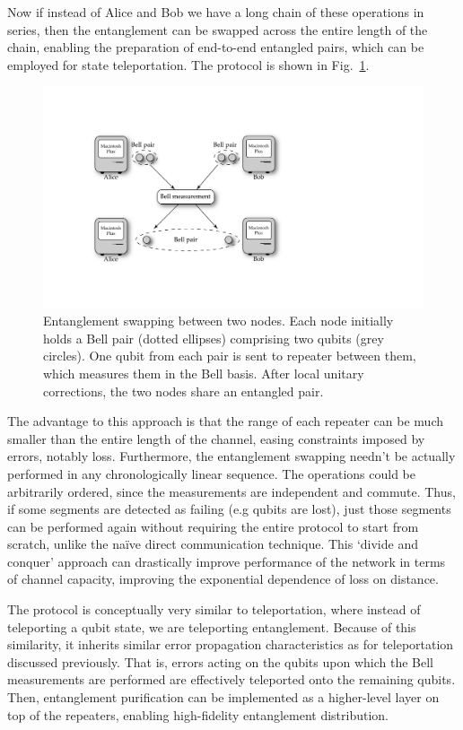 \documentclass[aps,rmp,twocolumn,amsmath,amssymb,nofootinbib,superscriptaddress]{revtex4}
\begin{document}
Now if instead of Alice and Bob we have a long chain of these operations in series, then the entanglement can be swapped across the entire length of the chain, enabling the preparation of end-to-end entangled pairs, which can be employed for state teleportation. The protocol is shown in Fig.~\ref{fig:ent_swap}.

\begin{figure}[!htb]
\includegraphics[width=\columnwidth]{ent_swap}
\caption{Entanglement swapping between two nodes. Each node initially holds a Bell pair (dotted ellipses) comprising two qubits (grey circles). One qubit from each pair is sent to repeater between them, which measures them in the Bell basis. After local unitary corrections, the two nodes share an entangled pair.} \label{fig:ent_swap}
\end{figure}

The advantage to this approach is that the range of each repeater can be much smaller than the entire length of the channel, easing constraints imposed by errors, notably loss. Furthermore, the entanglement swapping needn't be actually performed in any chronologically linear sequence. The operations could be arbitrarily ordered, since the measurements are independent and commute. Thus, if some segments are detected as failing (e.g qubits are lost), just those segments can be performed again without requiring the entire protocol to start from scratch, unlike the na{\" i}ve direct communication technique. This `divide and conquer' approach can drastically improve performance of the network in terms of channel capacity, improving the exponential dependence of loss on distance. 

The protocol is conceptually very similar to teleportation, where instead of teleporting a qubit state, we are teleporting entanglement. Because of this similarity, it inherits similar error propagation characteristics as for teleportation discussed previously. That is, errors acting on the qubits upon which the Bell measurements are performed are effectively teleported onto the remaining qubits. Then, entanglement purification can be implemented as a higher-level layer on top of the repeaters, enabling high-fidelity entanglement distribution.
\end{document}
